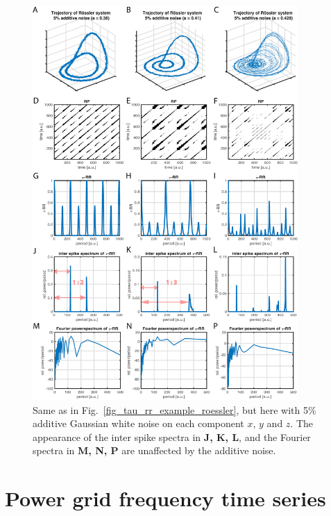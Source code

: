 \documentclass[entropy,article,submit,pdftex,moreauthors]{Definitions/mdpi}
\begin{document}
\begin{figure}[h!]
 \centering
 \includegraphics[width=0.9\textwidth]{./figures/fig_tau_rr_example_roessler_noise}
 \caption{Same as in Fig.~\ref{fig_tau_rr_example_roessler}, but here with 5\% additive Gaussian white noise on each component $x$, $y$ and $z$. The appearance of the inter spike spectra 
 in \textbf{J, K, L}, and the Fourier spectra in \textbf{M, N, P} are unaffected by the additive noise. }
\label{fig_tau_rr_example_roessler_noise}
\end{figure}

\section{Power grid frequency time series}\label{sec_power_grid_appendix}
\end{document}
